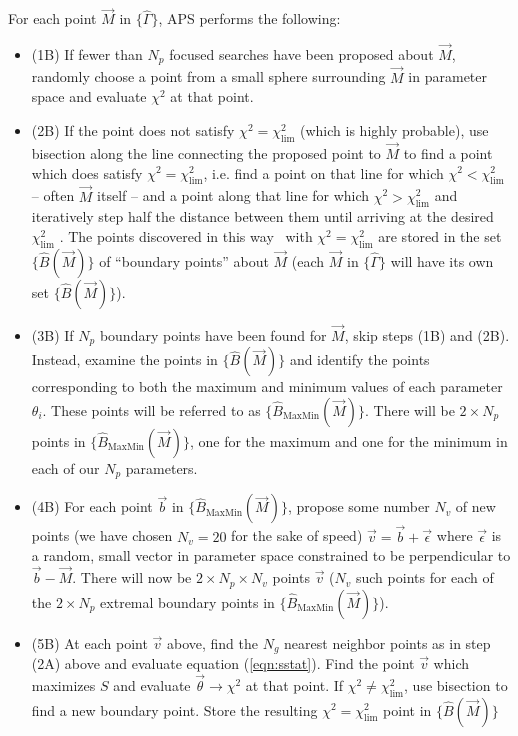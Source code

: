 \documentclass[useAMS,usenatbib]{aastex}
\begin{document}
For each point $\vec{M}$ in $\{\hat{\Gamma}\}$, APS performs the following:
\begin{itemize}
\item (1B) If fewer than $N_p$ focused searches have been proposed about $\vec{M}$, 
randomly choose a point from a small sphere surrounding $\vec{M}$ in parameter space and 
evaluate $\chi^2$ at that point.  
\\
\item(2B) If the point does not satisfy $\chi^2=\chi^2_\text{lim}$ (which is highly probable), 
use bisection
along the line connecting the proposed point to $\vec{M}$ to find a point which does
satisfy $\chi^2=\chi^2_\text{lim}$, i.e. find a point on that line for which
$\chi^2<\chi^2_\text{lim}$ -- often $\vec{M}$ itself -- and a point along that line
for which $\chi^2>\chi^2_\text{lim}$ and iteratively step half the distance between them until
arriving at the desired $\chi^2_\text{lim}$ \cite{minuit}.  The points discovered in this way \
with $\chi^2=\chi^2_\text{lim}$ are stored in the set $\{\hat{B}(\vec{M})\}$ of 
``boundary points'' about $\vec{M}$ (each $\vec{M}$ in $\{\hat{\Gamma}\}$ will have its own
set $\{\hat{B}(\vec{M})\}$).  
\\
\item(3B) If $N_p$ boundary points have been found for $\vec{M}$, skip steps (1B) and (2B).
Instead, examine the points in $\{\hat{B}(\vec{M})\}$ and identify the points
corresponding to both the maximum and minimum values of each parameter $\theta_i$.  These
points will be referred to as $\{\hat{B}_\text{MaxMin}(\vec{M})\}$.  
There will be $2\times N_p$ points in $\{\hat{B}_\text{MaxMin}(\vec{M})\}$, one for
the maximum and one for the minimum in each of our $N_p$ parameters.  
\\
\item(4B) For each point $\vec{b}$ in $\{\hat{B}_\text{MaxMin}(\vec{M})\}$, 
propose some number $N_v$ of new points (we have chosen
$N_v=20$ for the sake of speed) $\vec{v} = \vec{b}+\vec{\epsilon}$ where $\vec{\epsilon}$ is a
random, small vector in parameter space constrained to be perpendicular to
$\vec{b}-\vec{M}$.  There will now be $2\times N_p \times N_v$ points $\vec{v}$
($N_v$ such points for each of the $2\times N_p$ extremal boundary points in
$\{\hat{B}_\text{MaxMin}(\vec{M})\}$).
\\
\item(5B) At each point $\vec{v}$ above, find the $N_g$ nearest neighbor points as in step (2A) above
and evaluate equation (\ref{eqn:sstat}).  
Find the point $\vec{v}$ which maximizes $S$ and evaluate $\vec{\theta}\rightarrow\chi^2$ at
that point.  If
$\chi^2 \neq \chi^2_\text{lim}$, use bisection to find a new boundary point.
Store the resulting $\chi^2=\chi^2_\text{lim}$ point in $\{\hat{B}(\vec{M})\}$
\end{itemize}
\end{document}
